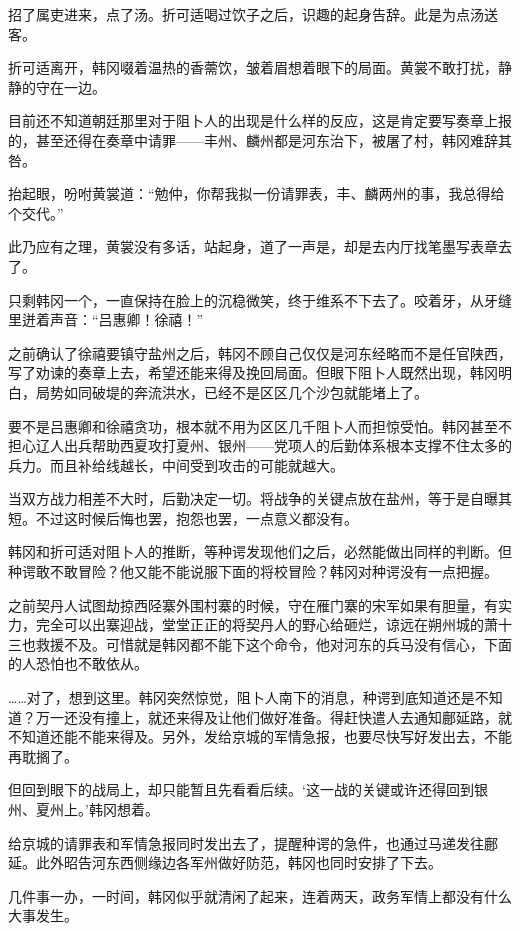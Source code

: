 招了属吏进来，点了汤。折可适喝过饮子之后，识趣的起身告辞。此是为点汤送客。

折可适离开，韩冈啜着温热的香薷饮，皱着眉想着眼下的局面。黄裳不敢打扰，静静的守在一边。

目前还不知道朝廷那里对于阻卜人的出现是什么样的反应，这是肯定要写奏章上报的，甚至还得在奏章中请罪——丰州、麟州都是河东治下，被屠了村，韩冈难辞其咎。

抬起眼，吩咐黄裳道：“勉仲，你帮我拟一份请罪表，丰、麟两州的事，我总得给个交代。”

此乃应有之理，黄裳没有多话，站起身，道了一声是，却是去内厅找笔墨写表章去了。

只剩韩冈一个，一直保持在脸上的沉稳微笑，终于维系不下去了。咬着牙，从牙缝里迸着声音：“吕惠卿！徐禧！”

之前确认了徐禧要镇守盐州之后，韩冈不顾自己仅仅是河东经略而不是任官陕西，写了劝谏的奏章上去，希望还能来得及挽回局面。但眼下阻卜人既然出现，韩冈明白，局势如同破堤的奔流洪水，已经不是区区几个沙包就能堵上了。

要不是吕惠卿和徐禧贪功，根本就不用为区区几千阻卜人而担惊受怕。韩冈甚至不担心辽人出兵帮助西夏攻打夏州、银州——党项人的后勤体系根本支撑不住太多的兵力。而且补给线越长，中间受到攻击的可能就越大。

当双方战力相差不大时，后勤决定一切。将战争的关键点放在盐州，等于是自曝其短。不过这时候后悔也罢，抱怨也罢，一点意义都没有。

韩冈和折可适对阻卜人的推断，等种谔发现他们之后，必然能做出同样的判断。但种谔敢不敢冒险？他又能不能说服下面的将校冒险？韩冈对种谔没有一点把握。

之前契丹人试图劫掠西陉寨外围村寨的时候，守在雁门寨的宋军如果有胆量，有实力，完全可以出寨迎战，堂堂正正的将契丹人的野心给砸烂，谅远在朔州城的萧十三也救援不及。可惜就是韩冈都不能下这个命令，他对河东的兵马没有信心，下面的人恐怕也不敢依从。

……对了，想到这里。韩冈突然惊觉，阻卜人南下的消息，种谔到底知道还是不知道？万一还没有撞上，就还来得及让他们做好准备。得赶快遣人去通知鄜延路，就不知道还能不能来得及。另外，发给京城的军情急报，也要尽快写好发出去，不能再耽搁了。

但回到眼下的战局上，却只能暂且先看看后续。‘这一战的关键或许还得回到银州、夏州上。’韩冈想着。

给京城的请罪表和军情急报同时发出去了，提醒种谔的急件，也通过马递发往鄜延。此外昭告河东西侧缘边各军州做好防范，韩冈也同时安排了下去。

几件事一办，一时间，韩冈似乎就清闲了起来，连着两天，政务军情上都没有什么大事发生。

